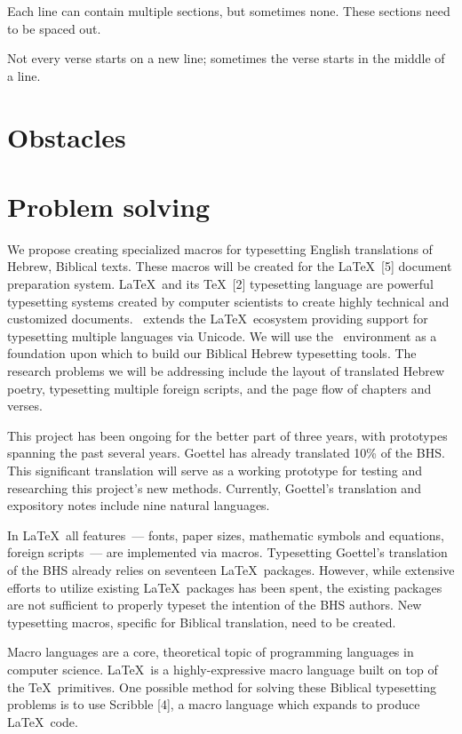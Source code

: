 \documentclass{acm_proc_article-sp}
\begin{document}
Each line can contain multiple sections, but sometimes none. These sections need to be spaced out.

Not every verse starts on a new line; sometimes the verse starts in the middle of a line. 

\section{Obstacles}
\section{Problem solving}
We propose creating specialized macros for typesetting English translations of Hebrew, Biblical texts. These macros will be created for the \LaTeX\ [5] document preparation system. \LaTeX\ and its \TeX\ [2] typesetting language are powerful typesetting systems created by computer scientists to create highly technical and customized documents. \XeTeX\ extends the \LaTeX\ ecosystem providing support for typesetting multiple languages via Unicode. We will use the \XeTeX\ environment as a foundation upon which to build our Biblical Hebrew typesetting tools. The research problems we will be addressing include the layout of translated Hebrew poetry, typesetting multiple foreign scripts, and the page flow of chapters and verses.

This project has been ongoing for the better part of three years, with prototypes spanning the past several years. Goettel has already translated 10\% of the BHS. This significant translation will serve as a working prototype for testing and researching this project's new methods. Currently, Goettel's translation and expository notes include nine natural languages.

In \LaTeX\, all features~--- fonts, paper sizes, mathematic symbols and equations, foreign scripts~--- are implemented via macros. Typesetting Goettel's translation of the BHS already relies on seventeen \LaTeX\ packages. However, while extensive efforts to utilize existing \LaTeX\ packages has been spent, the existing packages are not sufficient to properly typeset the intention of the BHS authors. New typesetting macros, specific for Biblical translation, need to be created.

Macro languages are a core, theoretical topic of programming languages in computer science. \LaTeX\ is a highly-expressive macro language built on top of the \TeX\ primitives. One possible method for solving these Biblical typesetting problems is to use Scribble [4], a macro language which expands to produce \LaTeX\ code.
\end{document}
